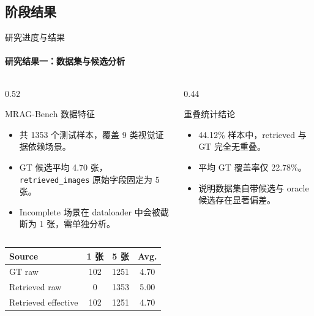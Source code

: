 \documentclass[10pt,aspectratio=169,]{beamer}
\begin{document}
\subsection{阶段结果}
\begin{frame}{研究进度与结果}
	\framesubtitle{研究结果一：数据集与候选分析}
	\begin{columns}[T]
		\begin{column}{0.52\textwidth}
			\begin{block}{MRAG-Bench 数据特征}
				\begin{itemize}
					\item 共 1353 个测试样本，覆盖 9 类视觉证据依赖场景。
					\item GT 候选平均 4.70 张，\texttt{retrieved\_images} 原始字段固定为 5 张。
					\item Incomplete 场景在 dataloader 中会被截断为 1 张，需单独分析。
				\end{itemize}
			\end{block}
		\end{column}
		\begin{column}{0.44\textwidth}
			\begin{alertblock}{重叠统计结论}
				\begin{itemize}
					\item 44.12\% 样本中，retrieved 与 GT 完全无重叠。
					\item 平均 GT 覆盖率仅 22.78\%。
					\item 说明数据集自带候选与 oracle 候选存在显著偏差。
				\end{itemize}
			\end{alertblock}
		\end{column}
	\end{columns}
	\vspace{0.4em}
	\centering
	\scriptsize
	\begin{tabular}{lccc}
		\toprule
		Source & 1 张 & 5 张 & Avg. \\
		\midrule
		GT raw & 102 & 1251 & 4.70 \\
		Retrieved raw & 0 & 1353 & 5.00 \\
		Retrieved effective & 102 & 1251 & 4.70 \\
		\bottomrule
	\end{tabular}
\end{frame}
\end{document}
